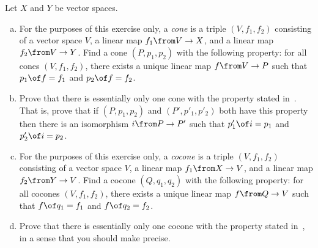 \begin{iquestion}
Let $X$ and $Y$ be vector spaces.  
% 
\begin{enumerate}[(b)]
\item   
\label{part:vs-prod}
For the purposes of this exercise only, a \emph{cone} is a triple $(V, f_1,
f_2)$ consisting of a vector space $V$, a linear map $f_1\from V \to X$, and
a linear map $f_2\from V \to Y$.  Find a cone $(P, p_1,
p_2)$ with the following property: for all cones $(V, f_1, f_2)$, there exists
a unique linear map $f\from V \to P$ such that $p_1 \of f = f_1$ and $p_2 \of f
= f_2$.

\item 
Prove that there is essentially only one cone with the property stated
in~.  That is, prove that if $(P, p_1, p_2)$ and $(P',
p'_1, p'_2)$ both have this property then there is an isomorphism $i\from P
\to P'$ such that $p'_1 \of i = p_1$ and $p'_2 \of i = p_2$.

\item   
\label{part:vs-coprod} 
For the purposes of this exercise only, a \emph{cocone} is a triple $(V,
f_1, f_2)$ consisting of a vector space $V$, a linear map $f_1\from X \to
V$, and a linear map $f_2\from Y \to V$.  Find a cocone $(Q, q_1, q_2)$
with the following property: for all cocones $(V, f_1, f_2)$, there exists
a unique linear map $f\from Q \to V$ such that $f \of q_1 = f_1$ and $f \of
q_2 = f_2$.

\item 
Prove that there is essentially only one cocone with the property stated
 in~, in a sense that you should make precise.  
\end{enumerate}
\end{iquestion}

